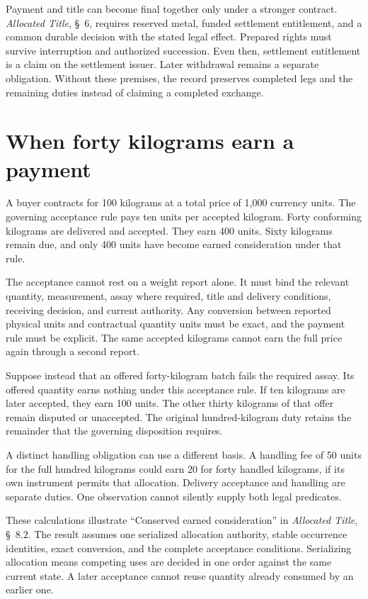 \documentclass{momentum}
\begin{document}
Payment and title can become final together only under a stronger contract. \emph{Allocated Title}, \S~6, requires reserved metal, funded settlement entitlement, and a common durable decision with the stated legal effect. Prepared rights must survive interruption and authorized succession. Even then, settlement entitlement is a claim on the settlement issuer. Later withdrawal remains a separate obligation. Without these premises, the record preserves completed legs and the remaining duties instead of claiming a completed exchange.

\section{When forty kilograms earn a payment}

A buyer contracts for 100 kilograms at a total price of 1,000 currency units. The governing acceptance rule pays ten units per accepted kilogram. Forty conforming kilograms are delivered and accepted. They earn 400 units. Sixty kilograms remain due, and only 400 units have become earned consideration under that rule.

The acceptance cannot rest on a weight report alone. It must bind the relevant quantity, measurement, assay where required, title and delivery conditions, receiving decision, and current authority. Any conversion between reported physical units and contractual quantity units must be exact, and the payment rule must be explicit. The same accepted kilograms cannot earn the full price again through a second report.

Suppose instead that an offered forty-kilogram batch fails the required assay. Its offered quantity earns nothing under this acceptance rule. If ten kilograms are later accepted, they earn 100 units. The other thirty kilograms of that offer remain disputed or unaccepted. The original hundred-kilogram duty retains the remainder that the governing disposition requires.

A distinct handling obligation can use a different basis. A handling fee of 50 units for the full hundred kilograms could earn 20 for forty handled kilograms, if its own instrument permits that allocation. Delivery acceptance and handling are separate duties. One observation cannot silently supply both legal predicates.

These calculations illustrate ``Conserved earned consideration'' in \emph{Allocated Title}, \S~8.2. The result assumes one serialized allocation authority, stable occurrence identities, exact conversion, and the complete acceptance conditions. Serializing allocation means competing uses are decided in one order against the same current state. A later acceptance cannot reuse quantity already consumed by an earlier one.
\end{document}
